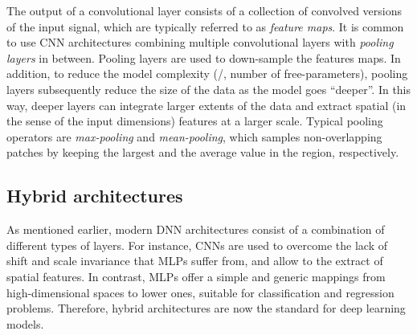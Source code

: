 The output of a convolutional layer consists of a collection of convolved versions of the input signal, which are typically referred to as \textit{feature maps}.
It is common to use \ac{CNN} architectures combining multiple convolutional layers with \textit{pooling layers} in between.
Pooling layers are used to down-sample the features maps.
In addition, to reduce the model complexity (\ie/, number of free-parameters), pooling layers subsequently reduce the size of the data as the model goes ``deeper''.
In this way, deeper layers can integrate larger extents of the data and extract spatial (in the sense of the input dimensions) features at a larger scale.
Typical pooling operators are \textit{max-pooling} and \textit{mean-pooling}, which samples non-overlapping patches by keeping the largest and the average value in the region, respectively.

\subsection{Hybrid architectures}
As mentioned earlier, modern \ac{DNN} architectures consist of a combination of different types of layers.
For instance, \acp{CNN} are used to overcome the lack of shift and scale invariance that \acp{MLP} suffer from, and allow to the extract of spatial features.
In contrast, \acp{MLP} offer a simple and generic mappings from high-dimensional spaces to lower ones, suitable for classification and regression problems.
Therefore, hybrid architectures are now the standard for deep learning models.

